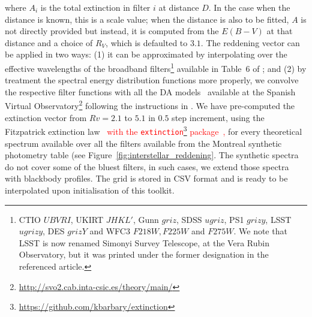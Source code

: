 \documentclass[fleqn,usenatbib]{rasti}
\begin{document}
where $A_i$ is the total extinction in filter $i$ at distance $D$. In the case
when the distance is known, this is a scale value; when the distance is also
to be fitted, $A$ is not directly provided but instead, it is computed from the
$E(B-V)$ at that distance and a choice of $R_{V}$, which is defaulted to $3.1$.
The reddening vector can be applied in two ways: (1) it can be approximated by
interpolating over the effective wavelengths of the broadband
filters\footnote{CTIO $UBVRI$, UKIRT $JHKL'$, Gunn $griz$, SDSS $ugriz$,
PS1 $grizy$, LSST $ugrizy$, DES $grizY$ and WFC3 $F218W, F225W$ and $F275W$.
We note that LSST is now renamed Simonyi Survey Telescope, at the Vera Rubin
Observatory, but it was printed under the former designation in the referenced
article.} available in Table~6 of \citet{2011ApJ...737..103S}; and (2) by
treatment the spectral energy distribution functions more properly, we convolve
the respective filter functions with all the DA
models~\citep{2009ApJ...696.1755T, 2010MmSAI..81..921K} available at the
Spanish Virtual
Observatory\footnote{\url{http://svo2.cab.inta-csic.es/theory/main/}} following
the instructions in \citet{2011ApJ...737..103S}. We have pre-computed the
extinction vector from $Rv = 2.1$ to $5.1$ in $0.5$ step increment, using the
Fitzpatrick extinction law~\citep{1999PASP..111...63F} 
\textcolor{red}{with the \texttt{extinction}\footnote{\url{https://github.com/kbarbary/extinction}}
package~\citep{2016zndo....804967B},} for every theoretical
spectrum available over all the filters available from the Montreal synthetic
photometry table (see Figure~\ref{fig:interstellar_reddening}. The synthetic
spectra do not cover some of the bluest filters, in such cases, we extend
those spectra with blackbody profiles. The grid is stored in CSV format and
is ready to be interpolated upon initialisation of this toolkit.
\end{document}
